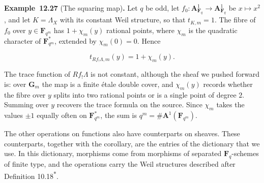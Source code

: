 \documentclass[11pt]{article}
\newenvironment{bpstatement}[2]{\par\addvspace{0.6\baselineskip}\noindent\textbf{#1}#2\textbf{.}\enspace\ignorespaces}
  {\par\addvspace{0.4\baselineskip}}
\newcommand{\bpout}[1]{#1\textsuperscript{\hyperlink{bp-outside}{\ensuremath{\ast}}}}
\begin{document}
\label{bp82}%
\begin{bpstatement}{Example~12.27}{ (The squaring map)}
Let \(q\) be odd, let \(f_0:\mathbf A^1_{\mathbf F_q}\to\mathbf A^1_{\mathbf F_q}\) be \(x\mapsto x^2\), and let \(K=\Lambda_X\) with its constant Weil structure, so that \(t_{K,m}=1\). The fibre of \(f_0\) over \(y\in\mathbf F_{q^m}\) has \(1+\chi_m(y)\) rational points, where \(\chi_m\) is the quadratic character of \(\mathbf F_{q^m}^*\), extended by \(\chi_m(0)=0\). Hence

\[
t_{Rf_!\Lambda,m}(y)=1+\chi_m(y).
\]

The trace function of \(Rf_!\Lambda\) is not constant, although the sheaf we pushed forward is: over \(\mathbf G_m\) the map is a finite étale double cover, and \(\chi_m(y)\) records whether the fibre over \(y\) splits into two rational points or is a single point of degree \(2\). Summing over \(y\) recovers the trace formula on the source. Since \(\chi_m\) takes the values \(\pm1\) equally often on \(\mathbf F_{q^m}^*\), the sum is \(q^m=\#\mathbf A^1(\mathbf F_{q^m})\).
\end{bpstatement}

\label{bp83}%
The other operations on functions also have counterparts on sheaves. These counterparts, together with the corollary, are the entries of the dictionary that we use. In this dictionary, morphisms come from morphisms of separated \(\mathbf F_q\)-schemes of finite type, and the operations carry the Weil structures described after Definition \bpout{10.18}.
\end{document}
